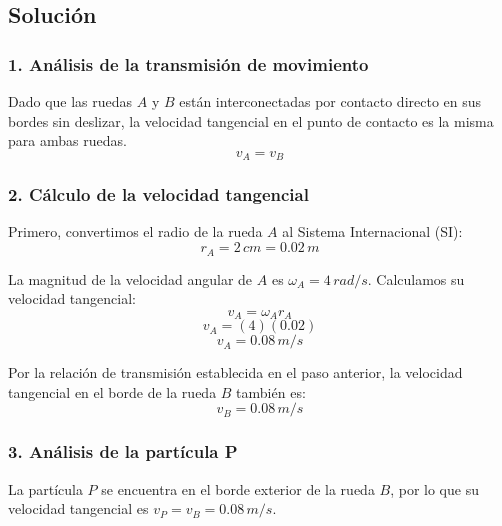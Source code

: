 \documentclass[12pt, a4paper]{article}
\begin{document}
\begin{center}
\end{center}

\subsection*{Solución}

\subsubsection*{1. Análisis de la transmisión de movimiento}
Dado que las ruedas $A$ y $B$ están interconectadas por contacto directo en sus bordes sin deslizar, la velocidad tangencial en el punto de contacto es la misma para ambas ruedas.
$$ v_A = v_B $$

\subsubsection*{2. Cálculo de la velocidad tangencial}
Primero, convertimos el radio de la rueda $A$ al Sistema Internacional (SI):
$$ r_A = 2 \, \si{cm} = 0.02 \, \si{m} $$

La magnitud de la velocidad angular de $A$ es $\omega_A = 4 \, \si{rad/s}$. Calculamos su velocidad tangencial:
$$ v_A = \omega_A r_A $$
$$ v_A = (4)(0.02) $$
$$ v_A = 0.08 \, \si{m/s} $$

Por la relación de transmisión establecida en el paso anterior, la velocidad tangencial en el borde de la rueda $B$ también es:
$$ v_B = 0.08 \, \si{m/s} $$

\subsubsection*{3. Análisis de la partícula P}
La partícula $P$ se encuentra en el borde exterior de la rueda $B$, por lo que su velocidad tangencial es $v_P = v_B = 0.08 \, \si{m/s}$. 
\end{document}
